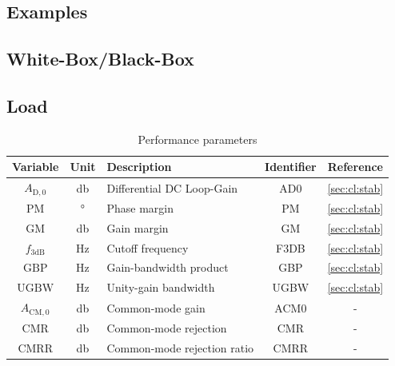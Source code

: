 \documentclass{article}[11pt]
\begin{document}
\subsection{Examples}

\subsection{White-Box/Black-Box}

\subsection{Load}


\begin{table}[H]
\centering
\caption{Performance parameters}
\begin{tabular}{cclcc}
\toprule
\textbf{Variable}            & \textbf{Unit}             & \textbf{Description}                      & \textbf{Identifier} & \textbf{Reference} \\ \midrule
$A_{\mathrm{D,0}}$            & \si{\decibel}            & Differential DC Loop-Gain                 & AD0                 & \ref{sec:cl:stab}  \\
$\mathrm{PM}$                & \si{\degree}              & Phase margin                              & PM                  & \ref{sec:cl:stab}  \\
$\mathrm{GM}$                & \si{\decibel}             & Gain margin                               & GM                  & \ref{sec:cl:stab}  \\
$f_{\mathrm{3dB}}$           & \si{\hertz}               & Cutoff frequency                          & F3DB                & \ref{sec:cl:stab}  \\
$\mathrm{GBP}$               & \si{\hertz}               & Gain-bandwidth product                    & GBP                 & \ref{sec:cl:stab}  \\
$\mathrm{UGBW}$              & \si{\hertz}               & Unity-gain bandwidth                      & UGBW                & \ref{sec:cl:stab}  \\
$A_{\mathrm{CM,0}}$          & \si{\decibel}             & Common-mode gain                          & ACM0                & -                  \\
$\mathrm{CMR}$               & \si{\decibel}             & Common-mode rejection                     & CMR                 & -                  \\
$\mathrm{CMRR}$              & \si{\decibel}             & Common-mode rejection ratio               & CMRR                & -                  \\

\end{tabular}
\end{table}
\end{document}
